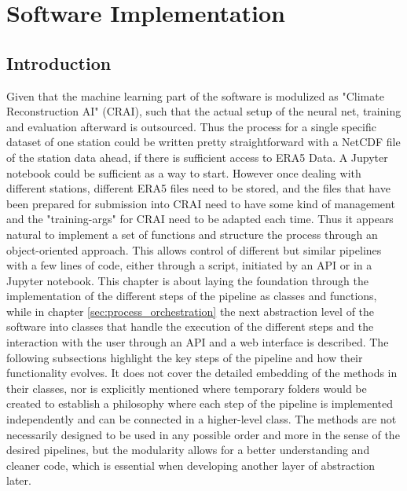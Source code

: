 \section{Software Implementation}
\label{sec:implementation}

\subsection{Introduction}

Given that the machine learning part of the software is modulized as "Climate Reconstruction AI" (CRAI), such that the actual setup of the neural net, training and evaluation afterward is outsourced. Thus the process for a single specific dataset of one station could be written pretty straightforward with a NetCDF file of the station data ahead, if there is sufficient access to ERA5 Data. A Jupyter notebook could be sufficient as a way to start. However once dealing with different stations, different ERA5 files need to be stored, and the files that have been prepared for submission into CRAI need to have some kind of management and the "training-args" for CRAI need to be adapted each time. Thus it appears natural to implement a set of functions and structure the process through an object-oriented approach. This allows control of different but similar pipelines with a few lines of code, either through a script, initiated by an API or in a Jupyter notebook.
This chapter is about laying the foundation through the implementation of the different steps of the pipeline as classes and functions, while in chapter \autoref{sec:process_orchestration} the next abstraction level of the software into classes that handle the execution of the different steps and the interaction with the user through an API and a web interface is described.
The following subsections highlight the key steps of the pipeline and how their functionality evolves. It does not cover the detailed embedding of the methods in their classes, nor is explicitly mentioned where temporary folders would be created to establish a philosophy where each step of the pipeline is implemented independently and can be connected in a higher-level class. The methods are not necessarily designed to be used in any possible order and more in the sense of the desired pipelines, but the modularity allows for a better understanding and cleaner code, which is essential when developing another layer of abstraction later.

